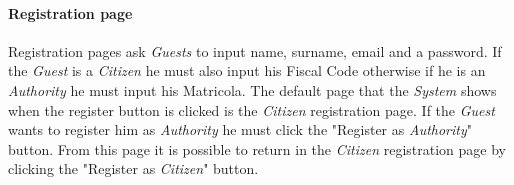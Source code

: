 \documentclass{article}
\begin{document}
\paragraph{Registration page}
Registration pages ask \textit{Guests} to input name, surname, email and a password. If the \textit{Guest} is a \textit{Citizen}
he must also input his Fiscal Code otherwise if he is an \textit{Authority} he must input his Matricola. The default page that the 
\textit{System} shows when the register button is clicked is the \textit{Citizen} registration page. If the \textit{Guest} wants
to register him as \textit{Authority} he must click the "Register as \textit{Authority}" button. From this page it is possible
to return in the \textit{Citizen} registration page by clicking the "Register as \textit{Citizen}" button.   
\\
\\
\\
\\
\end{document}
